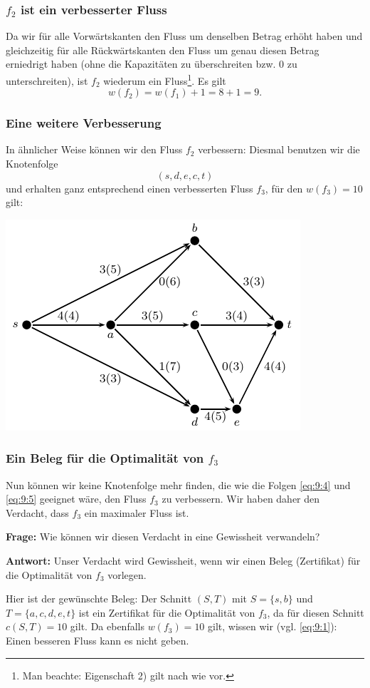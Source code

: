 \documentclass[smaller]{beamer}
\begin{document}
\begin{frame}
 \frametitle{$f_2$ ist ein verbesserter Fluss}
 Da wir für alle {\glqq}Vorwärtskanten{\grqq} den Fluss um denselben Betrag erhöht haben und gleichzeitig für alle {\glqq}Rückwärtskanten{\grqq} den Fluss um genau diesen Betrag erniedrigt haben (ohne die Kapazitäten zu überschreiten bzw. $0$ zu unterschreiten), ist $f_2$ wiederum ein Fluss\footnote{Man beachte: Eigenschaft 2) gilt nach wie vor.}. Es gilt
\[
w(f_2) = w(f_1) + 1 = 8+1 = 9.
\]
\end{frame}

\begin{frame}
 \frametitle{Eine weitere Verbesserung}
 In ähnlicher Weise können wir den Fluss $f_2$ verbessern: Diesmal benutzen wir die Knotenfolge
\begin{equation}
\label{eq:9:5}
(s,d,e,c,t)
\end{equation}
und erhalten ganz entsprechend einen verbesserten Fluss $f_3$, für den $w(f_3)=10$ gilt:
\begin{center}
  \includegraphics{fig16.pdf}
 \end{center}
\end{frame}

\begin{frame}
 \frametitle{Ein Beleg für die Optimalität von $f_3$}
 Nun können wir keine Knotenfolge mehr finden, die wie die Folgen \eqref{eq:9:4} und \eqref{eq:9:5} geeignet wäre, den Fluss $f_3$ zu verbessern. Wir haben daher den \alert{Verdacht}, dass $f_3$ ein maximaler Fluss ist. \\ \vspace*{0.2cm}

\textbf{Frage:} Wie können wir diesen Verdacht in eine Gewissheit verwandeln? \\ \vspace*{0.2cm}

\textbf{Antwort:} Unser Verdacht wird Gewissheit, wenn wir einen \alert{Beleg (Zertifikat)} für die Optimalität von $f_3$ vorlegen. \\ \vspace*{0.2cm}

\alert{Hier ist der gewünschte Beleg:} Der Schnitt $(S,T)$ mit $S= \big\{ s,b \big\}$ und $T = \big\{ a,c,d,e,t \big\}$ ist ein Zertifikat für die Optimalität von $f_3$, da für diesen Schnitt $c(S,T)=10$ gilt. Da ebenfalls $w(f_3)=10$ gilt, wissen wir (vgl. \eqref{eq:9:1}): Einen besseren Fluss kann es nicht geben.
\end{frame}
\end{document}
